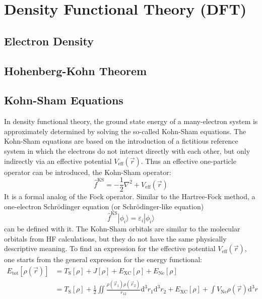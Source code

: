 \documentclass[9pt]{report}
\begin{document}
\newpage

\chapter{Density Functional Theory (DFT)}

\section{Electron Density}

\section{Hohenberg-Kohn Theorem}

\section{Kohn-Sham Equations}
In density functional theory, the ground state energy of a many-electron system is approximately determined by solving the so-called Kohn-Sham equations. The Kohn-Sham equations are based on the introduction of a fictitious reference system in which the electrons do not interact directly with each other, but only indirectly via an effective potential $V_{\mathrm{eff}}(\vec{r})$. Thus an effective one-particle operator can be introduced, the Kohn-Sham operator:
\begin{equation}
\hat{f}^{\mathrm{KS}}=-\frac{1}{2}\nabla^{2}+V_{\mathrm{eff}}(\vec{r})
\end{equation}
It is a formal analog of the Fock operator. Similar to the Hartree-Fock method, a one-electron Schrödinger equation (or Schrödinger-like equation)
\begin{equation}
\hat{f}^{\mathrm{KS}}|\phi_i\rangle = \varepsilon_{i}|\phi_i\rangle
\end{equation}
can be defined with it. The Kohn-Sham orbitals are similar to the molecular orbitals from HF calculations, but they do not have the same physically descriptive meaning. To find an expression for the effective potential $V_{\mathrm{eff}}(\vec{r})$, one starts from the general expression for the energy functional:
\begin{align}
E_{\mathrm{tot}}[\rho(\vec{r})] &= T_{\mathrm{S}}[\rho]+J[\rho]+E_{\mathrm{XC}}[\rho]+E_{\mathrm{Ne}}[\rho]\\
&= T_{\mathrm{S}}[\rho]+\frac{1}{2}\iint\frac{\rho(\vec{r}_1)\rho(\vec{r}_2)}{r_{12}}\mathrm{d}^{3}r_{1}\mathrm{d}^{3}r_2 +E_{\mathrm{XC}}[\rho] +\int V_{\mathrm{Ne}}\rho(\vec{r})\mathrm{d}^{3}r
\end{align}
\end{document}
